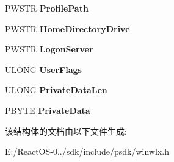 \begin{DoxyCompactItemize}
P\+W\+S\+TR {\bfseries Profile\+Path}
\item 
\mbox{\label{struct___w_l_x___c_o_n_s_o_l_e_s_w_i_t_c_h___c_r_e_d_e_n_t_i_a_l_s___i_n_f_o_a7fa014d8cfe30d2d696eccebfe00acae}} 
P\+W\+S\+TR {\bfseries Home\+Directory\+Drive}
\item 
\mbox{\label{struct___w_l_x___c_o_n_s_o_l_e_s_w_i_t_c_h___c_r_e_d_e_n_t_i_a_l_s___i_n_f_o_a8e990f3c12cfc23745273d5d465a6852}} 
P\+W\+S\+TR {\bfseries Logon\+Server}
\item 
\mbox{\label{struct___w_l_x___c_o_n_s_o_l_e_s_w_i_t_c_h___c_r_e_d_e_n_t_i_a_l_s___i_n_f_o_a21df3b722924a8a52d7f683cc9d64e03}} 
U\+L\+O\+NG {\bfseries User\+Flags}
\item 
\mbox{\label{struct___w_l_x___c_o_n_s_o_l_e_s_w_i_t_c_h___c_r_e_d_e_n_t_i_a_l_s___i_n_f_o_a6743d60414f4812e3b14f2919ee817bc}} 
U\+L\+O\+NG {\bfseries Private\+Data\+Len}
\item 
\mbox{\label{struct___w_l_x___c_o_n_s_o_l_e_s_w_i_t_c_h___c_r_e_d_e_n_t_i_a_l_s___i_n_f_o_ac7860d30a8cded68ac19c51c41c2885c}} 
P\+B\+Y\+TE {\bfseries Private\+Data}
\end{DoxyCompactItemize}


该结构体的文档由以下文件生成\+:\begin{DoxyCompactItemize}
\item 
E\+:/\+React\+O\+S-\/0../sdk/include/psdk/winwlx.\+h\end{DoxyCompactItemize}
